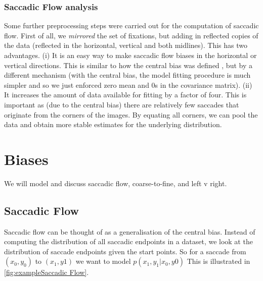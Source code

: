 \documentclass[a4paper, onecolumn, oneside, 11pt]{article}
\begin{document}
\subsubsection{Saccadic Flow analysis}
Some further preprocessing steps were carried out for the computation of saccadic flow. First of all, we \textit{mirrored} the set of fixations, but adding in reflected copies of the data (reflected in the horizontal, vertical and both midlines). This has two advantages. (i) It is an easy way to make saccadic flow biases in the horizontal or vertical directions. This is similar to how the central bias was defined \cite{clarke-tatler2014}, but by a different mechanism (with the central bias, the model fitting procedure is much simpler and so we just enforced zero mean and 0s in the covariance matrix). (ii) It increases the amount of data available for fitting by a factor of four. This is important as (due to the central bias) there are relatively few saccades that originate from the corners of the images. By equating all corners, we can pool the data and obtain more stable estimates for the underlying distribution. 



\section{Biases}

We will model and discuss saccadic flow, coarse-to-fine, and left v right. 

\subsection{Saccadic Flow}

Saccadic flow can be thought of as a generalisation of the central bias. Instead of computing the distribution of all saccadic endpoints in a dataset, we look at the distribution of saccade endpoints given the start points. So for a saccade from $(x_0, y_0)$ to $(x_1, y1)$ we want to model $p(x_1,y_1|x_0, y0)$ This is illustrated in \ref{fig:exampleSaccadic Flow}.
\end{document}
